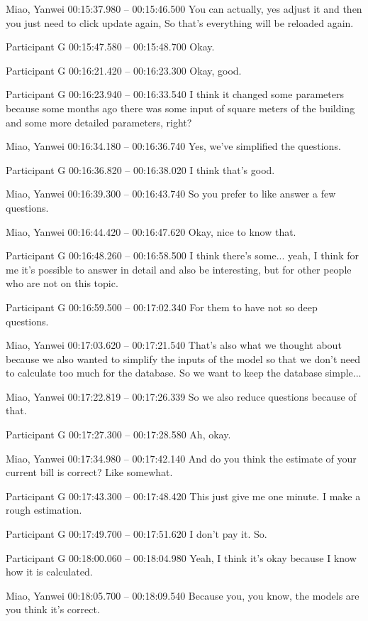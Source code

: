 {Miao, Yanwei 00:15:37.980 -- 00:15:46.500
You can actually, yes adjust it and then you just need to click update again, So that's everything will be reloaded again.

Participant G 00:15:47.580 -- 00:15:48.700
Okay.

Participant G 00:16:21.420 -- 00:16:23.300
Okay, good.

Participant G 00:16:23.940 -- 00:16:33.540
I think it changed some parameters because some months ago there was some input of square meters of the building and some more detailed parameters, right?

Miao, Yanwei 00:16:34.180 -- 00:16:36.740
Yes, we've simplified the questions.

Participant G 00:16:36.820 -- 00:16:38.020
I think that's good.

Miao, Yanwei 00:16:39.300 -- 00:16:43.740
So you prefer to like answer a few questions.

Miao, Yanwei 00:16:44.420 -- 00:16:47.620
Okay, nice to know that.

Participant G 00:16:48.260 -- 00:16:58.500
I think there's some... yeah, I think for me it's possible to answer in detail and also be interesting, but for other people who are not on this topic.

Participant G 00:16:59.500 -- 00:17:02.340
For them to have not so deep questions.

Miao, Yanwei 00:17:03.620 -- 00:17:21.540
That's also what we thought about because we also wanted to simplify the inputs of the model so that we don't need to calculate too much for the database. So we want to keep the database simple...

Miao, Yanwei 00:17:22.819 -- 00:17:26.339
So we also reduce questions because of that.

Participant G 00:17:27.300 -- 00:17:28.580
Ah, okay.

Miao, Yanwei 00:17:34.980 -- 00:17:42.140
And do you think the estimate of your current bill is correct? Like somewhat.

Participant G 00:17:43.300 -- 00:17:48.420
This just give me one minute. I make a rough estimation.

Participant G 00:17:49.700 -- 00:17:51.620
I don't pay it. So.

Participant G 00:18:00.060 -- 00:18:04.980
Yeah, I think it's okay because I know how it is calculated.

Miao, Yanwei 00:18:05.700 -- 00:18:09.540
Because you, you know, the models are you think it's correct.

}
